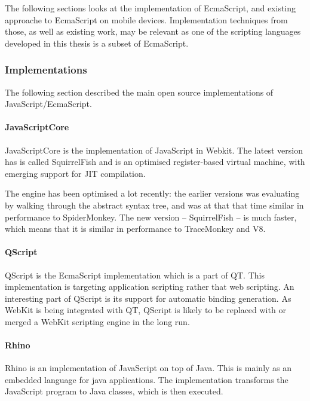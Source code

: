 \documentclass[11pt]{report}
\begin{document}
The following sections looks at the implementation of EcmaScript, and existing approache to EcmaScript on mobile devices. Implementation techniques from those, as well as existing work, may be relevant as one of the scripting languages developed in this thesis is a subset of EcmaScript.

\subsubsection{Implementations}
The following section described the main open source implementations of JavaScript/EcmaScript.

\paragraph{JavaScriptCore} 
JavaScriptCore is the implementation of JavaScript in Webkit.
The latest version has is called SquirrelFish and is an optimised register-based virtual machine,
with emerging support for JIT compilation.

The engine has been optimised a lot recently: the earlier versions was evaluating by walking through the abstract syntax tree, and was at that that time similar in performance to SpiderMonkey.
The new version -- SquirrelFish -- is much faster, which means that it is similar in performance to TraceMonkey and V8.

\paragraph{QScript}
QScript is the EcmaScript implementation which is a part of QT. This implementation is targeting application scripting rather that web scripting. An interesting part of QScript is its support for automatic binding generation. As WebKit is being integrated with QT, QScript is likely to be replaced with or merged a WebKit scripting engine in the long run.

\paragraph{Rhino}
Rhino is an implementation of JavaScript on top of Java. This is mainly as an embedded language for java applications. The implementation transforms the JavaScript program to Java classes, which is then executed.
\end{document}
